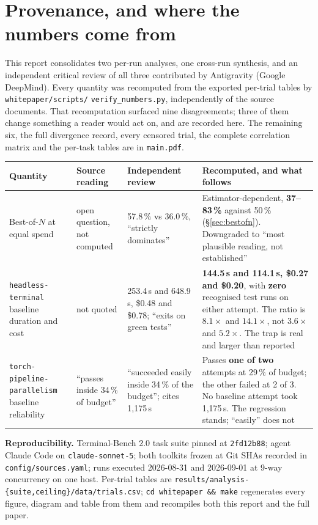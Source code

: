 \documentclass[11pt,a4paper]{article}
\newcommand{\code}[1]{\texttt{\small #1}}
\newcommand{\task}[1]{\texttt{\footnotesize #1}}
\begin{document}
\clearpage
\section{Provenance, and where the numbers come from}

This report consolidates two per-run analyses, one cross-run synthesis, and an independent
critical review of all three contributed by Antigravity (Google DeepMind). Every quantity was
recomputed from the exported per-trial tables by \code{whitepaper/scripts/}\allowbreak
\code{verify\_numbers.py}, independently of the source documents. That recomputation surfaced
nine disagreements; three of them change something a reader would act on, and are recorded
here. The remaining six, the full divergence record, every censored trial, the complete
correlation matrix and the per-task tables are in \code{main.pdf}.

\begin{center}\footnotesize
\begin{tabular}{@{}p{3.0cm}p{3.4cm}p{3.4cm}p{4.6cm}@{}}
\toprule
Quantity & Source reading & Independent review & Recomputed, and what follows \\
\midrule
Best-of-$N$ at equal spend &
open question, not computed &
57.8\,\% vs 36.0\,\%, ``strictly dominates'' &
Estimator-dependent, \textbf{37--83\,\%} against 50\,\% (\S\ref{sec:bestofn}). Downgraded to
``most plausible reading, not established'' \\
\addlinespace
\task{headless-terminal} baseline duration and cost &
not quoted &
253.4\,s and 648.9\,s, \$0.48 and \$0.78; ``exits on green tests'' &
\textbf{144.5\,s and 114.1\,s, \$0.27 and \$0.20}, with \textbf{zero} recognised test runs on
either attempt. The ratio is $8.1\times$ and $14.1\times$, not $3.6\times$ and $5.2\times$.
The trap is real and larger than reported \\
\addlinespace
\task{torch-pipeline-} \task{parallelism} baseline reliability &
``passes inside 34\,\% of budget'' &
``succeeded easily inside 34\,\% of the budget''; cites 1{,}175\,s &
Passes \textbf{one of two} attempts at 29\,\% of budget; the other failed at 2 of 3. No
baseline attempt took 1{,}175\,s. The regression stands; ``easily'' does not \\
\bottomrule
\end{tabular}
\end{center}

\medskip
\noindent\textbf{Reproducibility.} Terminal-Bench 2.0 task suite pinned at \code{2fd12b88};
agent Claude Code on \code{claude-sonnet-5}; both toolkits frozen at Git SHAs recorded in
\code{config/sources.yaml}; runs executed 2026-08-31 and 2026-09-01 at 9-way concurrency on one
host. Per-trial tables are \code{results/analysis-\{suite,ceiling\}/data/trials.csv};
\code{cd whitepaper \&\& make} regenerates every figure, diagram and table from them and
recompiles both this report and the full paper.
\end{document}

